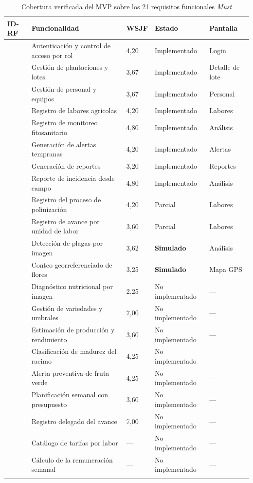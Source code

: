 \footnotesize
\begin{longtable}{|C{1.4cm}|L{5.6cm}|C{1.4cm}|C{2.6cm}|L{3.4cm}|}
\hline
{}\textbf{ID-RF} & \textbf{Funcionalidad} & \textbf{WSJF} & \textbf{Estado} & \textbf{Pantalla} \\
\hline
\endhead
{} & Autenticación y control de acceso por rol & 4,20 & Implementado & Login \\ \hline
{} & Gestión de plantaciones y lotes & 3,67 & Implementado & Detalle de lote \\ \hline
{} & Gestión de personal y equipos & 3,67 & Implementado & Personal \\ \hline
{} & Registro de labores agrícolas & 4,20 & Implementado & Labores \\ \hline
{} & Registro de monitoreo fitosanitario & 4,80 & Implementado & Análisis \\ \hline
{} & Generación de alertas tempranas & 4,20 & Implementado & Alertas \\ \hline
{} & Generación de reportes & 3,20 & Implementado & Reportes \\ \hline
{} & Reporte de incidencia desde campo & 4,80 & Implementado & Análisis \\ \hline
{} & Registro del proceso de polinización & 4,20 & Parcial & Labores \\ \hline
{} & Registro de avance por unidad de labor & 3,60 & Parcial & Labores \\ \hline
{} & Detección de plagas por imagen & 3,62 & \textbf{Simulado} & Análisis \\ \hline
{} & Conteo georreferenciado de flores & 3,25 & \textbf{Simulado} & Mapa GPS \\ \hline
{} & Diagnóstico nutricional por imagen & 2,25 & No implementado & --- \\ \hline
{} & Gestión de variedades y umbrales & 7,00 & No implementado & --- \\ \hline
{} & Estimación de producción y rendimiento & 3,60 & No implementado & --- \\ \hline
{} & Clasificación de madurez del racimo & 4,25 & No implementado & --- \\ \hline
{} & Alerta preventiva de fruta verde & 4,25 & No implementado & --- \\ \hline
{} & Planificación semanal con presupuesto & 3,60 & No implementado & --- \\ \hline
{} & Registro delegado del avance & 7,00 & No implementado & --- \\ \hline
{} & Catálogo de tarifas por labor & --- & No implementado & --- \\ \hline
{} & Cálculo de la remuneración semanal & --- & No implementado & --- \\ \hline
\caption{Cobertura verificada del MVP sobre los 21 requisitos funcionales \emph{Must}}
\label{tab:mvp}
\end{longtable}

